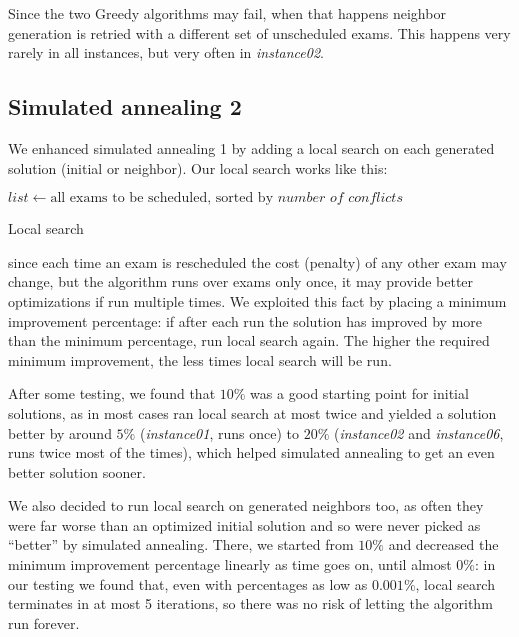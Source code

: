\documentclass[11pt, a4paper, leqno]{article}
\begin{document}
	Since the two Greedy algorithms may fail, when that happens neighbor generation is retried with a different set of unscheduled exams. This happens very rarely in all instances, but very often in \textit{instance02}.
	
	\subsection{Simulated annealing 2}
	
	We enhanced simulated annealing 1 by adding a local search on each generated solution (initial or neighbor). Our local search works like this:
	
	\begin{algorithm}[H]
		$list \gets \text{all exams to be scheduled, sorted by }\textit{number of conflicts}$\;
		\caption{Local search}
	\end{algorithm}

	since each time an exam is rescheduled the cost (penalty) of any other exam may change, but the algorithm runs over exams only once, it may provide better optimizations if run multiple times. We exploited this fact by placing a minimum improvement percentage: if after each run the solution has improved by more than the minimum percentage, run local search again. The higher the required minimum improvement, the less times local search will be run.
	
	After some testing, we found that $10\%$ was a good starting point for initial solutions, as in most cases ran local search at most twice and yielded a solution better by around $5\%$ (\textit{instance01}, runs once) to $20\%$ (\textit{instance02} and \textit{instance06}, runs twice most of the times), which helped simulated annealing to get an even better solution sooner.
	
	We also decided to run local search on generated neighbors too, as often they were far worse than an optimized initial solution and so were never picked as ``better'' by simulated annealing. There, we started from $10\%$ and decreased the minimum improvement percentage linearly as time goes on, until almost $0\%$: in our testing we found that, even with percentages as low as $0.001\%$, local search terminates in at most 5 iterations, so there was no risk of letting the algorithm run forever.
	
\end{document}
